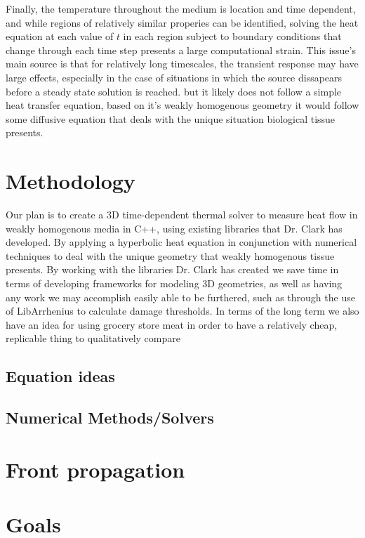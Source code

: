 \documentclass[12pt]{article}
\begin{document}
Finally, the temperature throughout the medium is location and time dependent, and while regions of relatively similar properies can be identified, solving the heat equation at each value of $t$ in each region subject to boundary conditions that change through each time step presents a large computational strain. This issue's main source is that for relatively long timescales, the transient response may have large effects, especially in the case of situations in which the source dissapears before a steady state solution is reached. but it likely does not follow a simple heat transfer equation, based on it's weakly homogenous geometry it would follow some diffusive equation that deals with the unique situation biological tissue presents.
\section{Methodology}

Our plan is to create a 3D time-dependent thermal solver to measure heat flow in weakly homogenous media in C++, using existing libraries that Dr. Clark has developed. By applying a hyperbolic heat equation in conjunction with numerical techniques to deal with the unique geometry that weakly homogenous tissue presents. By working with the libraries Dr. Clark has created we save time in terms of developing frameworks for modeling 3D geometries, as well as having any work we may accomplish easily able to be furthered, such as through the use of LibArrhenius to calculate damage thresholds. In terms of the long term we also have an idea for using grocery store meat in order to have a relatively cheap, replicable thing to qualitatively compare

\subsection{Equation ideas}
\subsection{Numerical Methods/Solvers}
\section{Front propagation}
\section{Goals}
\end{document}
